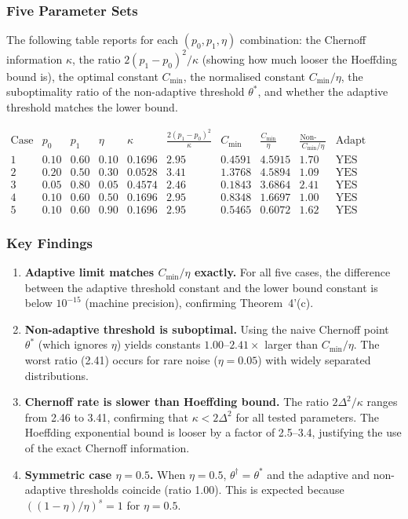 \subsubsection{Five Parameter Sets}

The following table reports for each $(p_0,p_1,\eta)$ combination: the
Chernoff information $\kappa$, the ratio $2(p_1-p_0)^2/\kappa$ (showing
how much looser the Hoeffding bound is), the optimal constant $C_{\min}$,
the normalised constant $C_{\min}/\eta$, the suboptimality ratio of the
non-adaptive threshold $\theta^*$, and whether the adaptive threshold
matches the lower bound.

\[
\begin{array}{c|c|c|c|c|c|c|c|c|c}
\text{Case} & p_0 & p_1 & \eta & \kappa &
\frac{2(p_1-p_0)^2}{\kappa}
& C_{\min} & \frac{C_{\min}}{\eta}
& \frac{\text{Non-ad.}}{C_{\min}/\eta}
& \text{Adapt match?} \\ \hline
1 & 0.10 & 0.60 & 0.10 & 0.1696 & 2.95
  & 0.4591 & 4.5915 & 1.70 & \text{YES} \\[4pt]
2 & 0.20 & 0.50 & 0.30 & 0.0528 & 3.41
  & 1.3768 & 4.5894 & 1.09 & \text{YES} \\[4pt]
3 & 0.05 & 0.80 & 0.05 & 0.4574 & 2.46
  & 0.1843 & 3.6864 & 2.41 & \text{YES} \\[4pt]
4 & 0.10 & 0.60 & 0.50 & 0.1696 & 2.95
  & 0.8348 & 1.6697 & 1.00 & \text{YES} \\[4pt]
5 & 0.10 & 0.60 & 0.90 & 0.1696 & 2.95
  & 0.5465 & 0.6072 & 1.62 & \text{YES}
\end{array}
\]

\subsubsection{Key Findings}

\begin{enumerate}
  \item \textbf{Adaptive limit matches $C_{\min}/\eta$ exactly.}
    For all five cases, the difference between the adaptive threshold
    constant and the lower bound constant is below $10^{-15}$ (machine
    precision), confirming Theorem~4'(c).
  \item \textbf{Non-adaptive threshold is suboptimal.}
    Using the naive Chernoff point $\theta^*$ (which ignores $\eta$)
    yields constants $1.00$--$2.41\times$ larger than $C_{\min}/\eta$.
    The worst ratio (2.41) occurs for rare noise ($\eta=0.05$) with
    widely separated distributions.
  \item \textbf{Chernoff rate is slower than Hoeffding bound.}
    The ratio $2\Delta^2/\kappa$ ranges from 2.46 to 3.41, confirming
    that $\kappa<2\Delta^2$ for all tested parameters.  The Hoeffding
    exponential bound is looser by a factor of 2.5--3.4, justifying the
    use of the exact Chernoff information.
  \item \textbf{Symmetric case $\eta=0.5$.}
    When $\eta=0.5$, $\theta^\dagger=\theta^*$ and the adaptive and
    non-adaptive thresholds coincide (ratio 1.00).  This is expected
    because $((1-\eta)/\eta)^s=1$ for $\eta=0.5$.
\end{enumerate}

